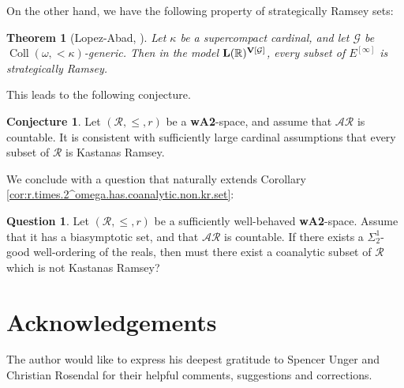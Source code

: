\documentclass[11pt,reqno]{amsart}
\theoremstyle{plain}
\numberwithin{equation}{section}
\newtheorem{theorem}{Theorem}[section]
\theoremstyle{definition}
\newtheorem{qn}{Question}
\newtheorem*{conjecture}{Conjecture}
\newcommand{\func}{\operatorname}
\newcommand{\R}{\mathbb{R}}
\newcommand{\cal}{\mathcal}
\renewcommand{\bf}{\mathbf}
\newcommand{\V}{\bf{V}}
\newcommand{\G}{\cal{G}}
\let\strokeL\L
\DeclareRobustCommand{\L}{\ifmmode\mathbf{L}\else\strokeL\fi}
\begin{document}
On the other hand, we have the following property of strategically Ramsey sets:

\begin{theorem}[Lopez-Abad, \cite{L05}]
    Let $\kappa$ be a supercompact cardinal, and let $\G$ be $\func{Coll}(\omega,<\kappa)$-generic. Then in the model $\L(\R)^{\V[\G]}$, every subset of $E^{[\infty]}$ is strategically Ramsey.
\end{theorem}

This leads to the following conjecture.

\begin{conjecture}
    Let $(\cal{R},\leq,r)$ be a \textbf{wA2}-space, and assume that $\cal{AR}$ is countable. It is consistent with sufficiently large cardinal assumptions that every subset of $\cal{R}$ is Kastanas Ramsey.
\end{conjecture}

We conclude with a question that naturally extends Corollary \ref{cor:r.times.2^omega.has.coanalytic.non.kr.set}:

\begin{qn}
\label{qn:analytic.non.kr.set}
    Let $(\cal{R},\leq,r)$ be a sufficiently well-behaved \textbf{wA2}-space. Assume that it has a biasymptotic set, and that $\cal{AR}$ is countable. If there exists a $\Sigma_2^1$-good well-ordering of the reals, then must there exist a coanalytic subset of $\cal{R}$ which is not Kastanas Ramsey?
\end{qn}

\section*{Acknowledgements}
The author would like to express his deepest gratitude to Spencer Unger and Christian Rosendal for their helpful comments, suggestions and corrections.

\printbibliography[heading=bibintoc,title={References}]
\end{document}
